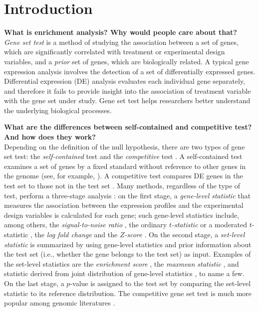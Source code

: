 \documentclass[useAMS,usenatbib, galley]{biom}
\begin{document}
	\section{Introduction}\label{section:introduction}
	
	\textbf{What is enrichment analysis? Why would people care about that?}\\
	\textit{Gene set test} is a method of studying the association between a set of genes, which are significantly correlated with treatment or experimental design variables, and a \textit{prior} set of genes, which are biologically related. A typical gene expression analysis involves the detection of a set of differentially expressed genes. Differential expression (DE) analysis  evaluates each individual gene separately, and therefore it fails to provide insight into the association of treatment variable with the gene set under study. Gene set test helps researchers better understand the underlying biological processes.
	
	\textbf{What are the differences between self-contained and competitive test? And how does they work?}\\
	Depending on the definition of the null hypothesis, there are two types of gene set test: the \textit{self-contained} test and the \textit{competitive} test \citep{goeman2007analyzing}. A self-contained test examines a set of genes by a fixed standard without reference to other genes in the genome (see, for example, \cite{goeman2004global,goeman2005testing, tsai2009multivariate, wu2010roast, huang2013gene}). A competitive test compares DE
	genes in the test set to those not in the test set \citep{tian2005discovering, wu2012camera, yaari2013quantitative}. Many methods, regardless of the type of test, perform a three-stage analysis \citep{khatri2012ten}: on the first stage, a \textit{gene-level statistic} that measures the association between the expression profiles and the experimental design variables is calculated for each gene; such gene-level statistics include, among others, the \textit{signal-to-noise ratio} \citep{subramanian2005gene}, the ordinary \textit{$t$-statistic} \citep{tian2005discovering} or a moderated $t$-statistic \citep{Smyth2004moderated}, the \textit{log fold change} \citep{kim2005page} and the \textit{$Z$-score} \citep{efron2007correlation}. On the second stage, a \textit{set-level statistic} is summarized by using gene-level statistics and prior information about the test set (i.e., whether the gene belongs to the test set) as input. Examples of the set-level statistics are the \textit{enrichment score} \citep{subramanian2005gene}, the \textit{maxmean statistic} \citep{efron2007testing}, and statistic derived from joint distribution of gene-level statistics \citep{yaari2013quantitative}, to name a few. On the last stage, a $p$-value is assigned to the test set by comparing the set-level statistic to its reference distribution. The competitive gene set test is much more popular among genomic literatures \citep{goeman2007analyzing, gatti2010heading}.  
	
\end{document}
